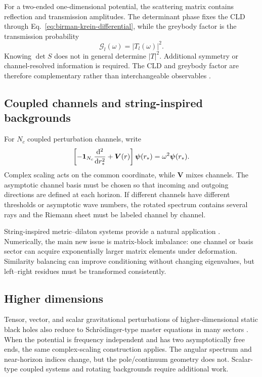 For a two-ended one-dimensional potential, the scattering matrix contains
reflection and transmission amplitudes.  The determinant phase fixes the CLD
through Eq.~\eqref{eq:birman-krein-differential}, while the greybody factor is
the transmission probability
\begin{equation}
  \mathcal G_l(\omega)=|T_l(\omega)|^2 .
  \label{eq:greybody-factor}
\end{equation}
Knowing $\det S$ does not in general determine $|T|^2$.  Additional symmetry
or channel-resolved information is required.  The CLD and greybody factor are
therefore complementary rather than interchangeable observables
\cite{Harmark:2007jy,Ogawa:2026dSCSM}.

\subsection{Coupled channels and string-inspired backgrounds}
\label{subsec:bh-coupled-channels}

For $N_c$ coupled perturbation channels, write
\begin{equation}
  \left[-\mathbf{1}_{N_c}\frac{\mathrm{d}^2}{\mathrm{d} r_*^2}
  +\bm V(r)\right]\bm\psi(r_*)
  =\omega^2\bm\psi(r_*) .
  \label{eq:coupled-bh-equation}
\end{equation}
Complex scaling acts on the common coordinate, while $\bm V$ mixes channels.
The asymptotic channel basis must be chosen so that incoming and outgoing
directions are defined at each horizon.  If different channels have different
thresholds or asymptotic wave numbers, the rotated spectrum contains several
rays and the Riemann sheet must be labeled channel by channel.

String-inspired metric--dilaton systems provide a natural application
\cite{Bian:2026crb}.  Numerically, the main new issue is matrix-block imbalance:
one channel or basis sector can acquire exponentially larger matrix elements
under deformation.  Similarity balancing can improve conditioning without
changing eigenvalues, but left--right residues must be transformed
consistently.

\subsection{Higher dimensions}
\label{subsec:bh-higher-d}

Tensor, vector, and scalar gravitational perturbations of higher-dimensional
static black holes also reduce to Schr\"odinger-type master equations in many
sectors
\cite{Kodama:2003jz,Ishibashi:2003ap,Ishibashi:2011ws}.  When the potential is
frequency independent and has two asymptotically free ends, the same
complex-scaling construction applies.  The angular spectrum and near-horizon
indices change, but the pole/continuum geometry does not.  Scalar-type coupled
systems and rotating backgrounds require additional work.
